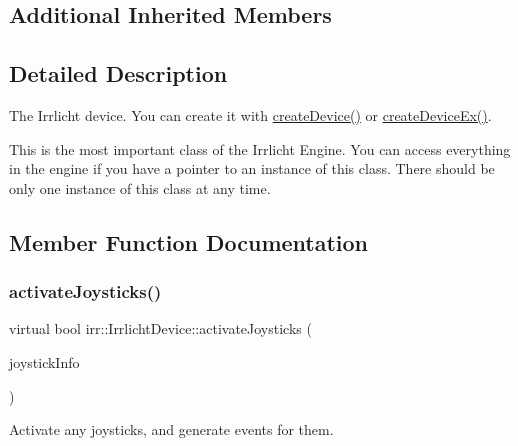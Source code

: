 \subsection*{Additional Inherited Members}


\subsection{Detailed Description}
The Irrlicht device. You can create it with \hyperlink{namespaceirr_abaf4d8719cc26b0d30813abf85e47c76}{create\+Device()} or \hyperlink{namespaceirr_ac83a30d674204dcb94d70f849e9b4a62}{create\+Device\+Ex()}. 

This is the most important class of the Irrlicht Engine. You can access everything in the engine if you have a pointer to an instance of this class. There should be only one instance of this class at any time. 

\subsection{Member Function Documentation}
\mbox{\label{classirr_1_1IrrlichtDevice_af06f8d2c4fdffd1f879e46685bcbc6e3}} 
\subsubsection{\texorpdfstring{activate\+Joysticks()}{activateJoysticks()}\hspace{0.1cm}{\footnotesize\ttfamily [1/2]}}
{\footnotesize\ttfamily virtual bool irr\+::\+Irrlicht\+Device\+::activate\+Joysticks (\begin{DoxyParamCaption}\item[{\hyperlink{classirr_1_1core_1_1array}{core\+::array}$<$ \hyperlink{structirr_1_1SJoystickInfo}{S\+Joystick\+Info} $>$ \&}]{joystick\+Info }\end{DoxyParamCaption})\hspace{0.3cm}{\ttfamily [pure virtual]}}



Activate any joysticks, and generate events for them. 

